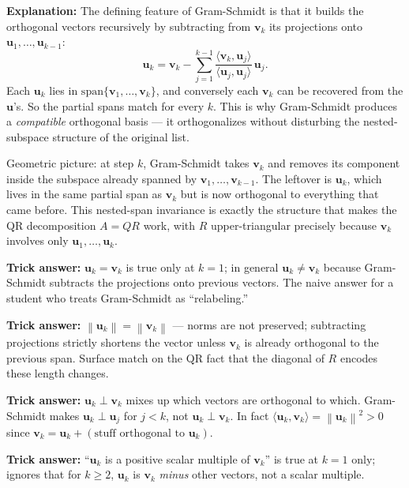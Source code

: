 \documentclass[12pt]{amsart}
\newcommand{\norm}[1]{\left\|#1\right\|}
\begin{document}
\textbf{Explanation:}
The defining feature of Gram-Schmidt is that it builds the orthogonal vectors
recursively by subtracting from $\mathbf{v}_k$ its projections onto
$\mathbf{u}_1, \ldots, \mathbf{u}_{k-1}$:
$$\mathbf{u}_k = \mathbf{v}_k - \sum_{j=1}^{k-1} \frac{\langle \mathbf{v}_k, \mathbf{u}_j\rangle}{\langle \mathbf{u}_j, \mathbf{u}_j\rangle}\, \mathbf{u}_j.$$
Each $\mathbf{u}_k$ lies in $\mathrm{span}\{\mathbf{v}_1, \ldots, \mathbf{v}_k\}$,
and conversely each $\mathbf{v}_k$ can be recovered from the $\mathbf{u}$'s.
So the partial spans match for every $k$. This is why Gram-Schmidt produces
a \emph{compatible} orthogonal basis --- it orthogonalizes without disturbing
the nested-subspace structure of the original list.

Geometric picture: at step $k$, Gram-Schmidt takes $\mathbf{v}_k$ and removes
its component inside the subspace already spanned by $\mathbf{v}_1, \ldots, \mathbf{v}_{k-1}$.
The leftover is $\mathbf{u}_k$, which lives in the same partial span as
$\mathbf{v}_k$ but is now orthogonal to everything that came before. This
nested-span invariance is exactly the structure that makes the QR decomposition
$A = QR$ work, with $R$ upper-triangular precisely because $\mathbf{v}_k$
involves only $\mathbf{u}_1, \ldots, \mathbf{u}_k$.

\textbf{Trick answer:}
$\mathbf{u}_k = \mathbf{v}_k$ is true only at $k=1$; in general
$\mathbf{u}_k \neq \mathbf{v}_k$ because Gram-Schmidt subtracts the
projections onto previous vectors. The naive answer for a student who
treats Gram-Schmidt as ``relabeling.''

\textbf{Trick answer:}
$\norm{\mathbf{u}_k} = \norm{\mathbf{v}_k}$ --- norms are not preserved;
subtracting projections strictly shortens the vector unless $\mathbf{v}_k$
is already orthogonal to the previous span. Surface match on the QR fact
that the diagonal of $R$ encodes these length changes.

\textbf{Trick answer:}
$\mathbf{u}_k \perp \mathbf{v}_k$ mixes up which vectors are orthogonal to
which. Gram-Schmidt makes $\mathbf{u}_k \perp \mathbf{u}_j$ for $j < k$,
not $\mathbf{u}_k \perp \mathbf{v}_k$. In fact
$\langle \mathbf{u}_k, \mathbf{v}_k \rangle = \norm{\mathbf{u}_k}^2 > 0$
since $\mathbf{v}_k = \mathbf{u}_k + (\text{stuff orthogonal to } \mathbf{u}_k)$.

\textbf{Trick answer:}
``$\mathbf{u}_k$ is a positive scalar multiple of $\mathbf{v}_k$'' is true
at $k=1$ only; ignores that for $k \geq 2$, $\mathbf{u}_k$ is $\mathbf{v}_k$
\emph{minus} other vectors, not a scalar multiple.
\end{document}
